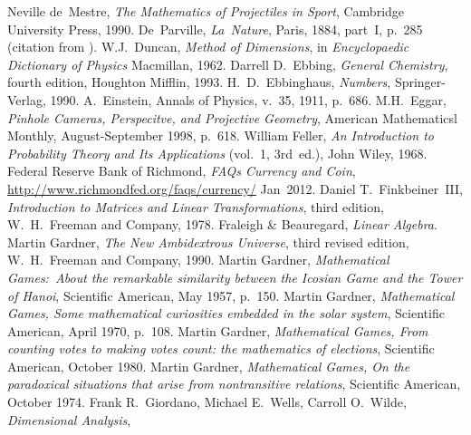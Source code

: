 \begin{thebibliography}{\makebox[2em][c]{{}\hfil{}}}
  Neville de~Mestre,
  \emph{The Mathematics of Projectiles in Sport},
  Cambridge University Press,
  1990.
 De~Parville,
 \emph{La~Nature},
 Paris, 1884,
 part~I,
 p.~285
 (citation from \cite{Ball}).
  W.J.~Duncan,
  \emph{Method of Dimensions},
  in
  \emph{Encyclopaedic Dictionary of Physics}
  Macmillan,
  1962.
  Darrell D.~Ebbing,
  \emph{General Chemistry},
  fourth edition,
  Houghton Mifflin,
  1993.
  H.\ D.\ Ebbinghaus,
  \emph{Numbers},
  Springer-Verlag,
  1990.
  A.~Einstein,
  Annals of Physics,
  v.~35, 1911,
  p.~686.
  M.H.~Eggar,
  \emph{Pinhole Cameras, Perspecitve, and Projective Geometry},
  American Mathematicsl Monthly,
  August-September 1998,
  p.~618.
  William Feller,
  \emph{An Introduction to Probability Theory and Its Applications}
  (vol.~1, 3rd~ed.),
  John Wiley, 1968.
  Federal Reserve Bank of Richmond,
  \emph{FAQs Currency and Coin},
  \url{http://www.richmondfed.org/faqs/currency/}
  Jan~2012.
  Daniel T.\ Finkbeiner~III,
  \emph{Introduction to Matrices and Linear Transformations},
  third edition,
  W.\ H.\ Freeman and Company,
  1978.
  Fraleigh \& Beauregard,
  \emph{Linear Algebra}.
  Martin Gardner,
  \emph{The New Ambidextrous Universe},
  third revised edition,
  W.\ H.\ Freeman and Company,
  1990.
 Martin Gardner,
 \emph{Mathematical Games:~About the remarkable similarity between
   the Icosian Game and the Tower of Hanoi},
 Scientific American,
 May 1957,
 p.~150. 
  Martin Gardner,
  \emph{Mathematical Games, Some mathematical curiosities embedded in the
        solar system},
  Scientific American,
  April 1970,
  p.~108.
  Martin Gardner,
  \emph{Mathematical Games, From counting votes to making votes count:
        the mathematics of elections},
  Scientific American,
  October 1980.
  Martin Gardner,
  \emph{Mathematical Games, On the paradoxical situations that arise from
        nontransitive relations},
  Scientific American,
  October 1974.
  Frank R.~Giordano,  Michael E.~Wells, Carroll O.~Wilde,
  \emph{Dimensional Analysis}, 

\end{thebibliography}
